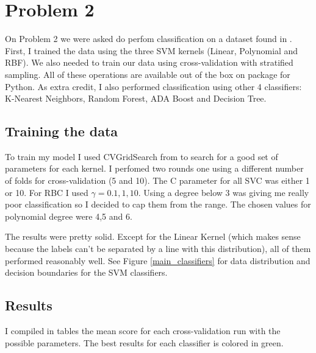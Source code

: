 \documentclass{article}
\begin{document}
\section{Problem 2}

On Problem 2 we were asked do perfom classification on a dataset found in . First, I trained the data using the three SVM kernels (Linear, Polynomial and RBF). We also needed to train our data using cross-validation with stratified sampling. All of these operations are available out of the box on  package for Python. As extra credit, I also performed classification using other 4 classifiers: K-Nearest Neighbors, Random Forest, ADA Boost and Decision Tree.

\subsection{Training the data}

To train my model I used CVGridSearch from  to search for a good set of parameters for each kernel. I perfomed two rounds one using a different number of folds for cross-validation (5 and 10). The C parameter for all SVC was either 1 or 10. For RBC I used $\gamma = {0.1, 1, 10}$. Using a degree below 3 was giving me really poor classification so I decided to cap them from the range. The chosen values for polynomial degree were 4,5 and 6.

The results were pretty solid. Except for the Linear Kernel (which makes sense because the labels can't be separated by a line with this distribution), all of them performed reasonably well. See Figure \ref{main_classifiers} for data distribution and decision boundaries for the SVM classifiers.

\subsection{Results}

I compiled in tables the mean score for each cross-validation run with the possible parameters. The best results for each classifier is colored in green.
\end{document}
